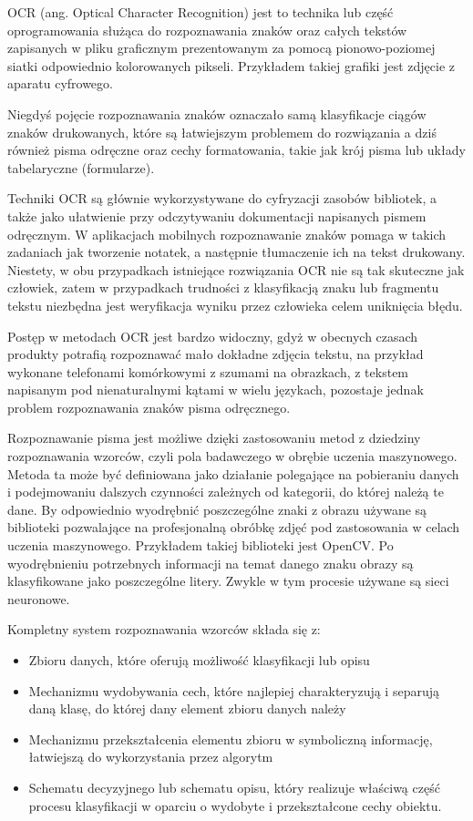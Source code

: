 \documentclass[brudnopis]{xmgr}
\begin{document}
OCR\cite{20} (ang. Optical Character Recognition) jest to technika lub część oprogramowania służąca do rozpoznawania znaków oraz całych tekstów zapisanych w pliku graficznym prezentowanym za pomocą pionowo-poziomej siatki odpowiednio kolorowanych pikseli. Przykładem takiej grafiki jest zdjęcie z aparatu cyfrowego. 

Niegdyś pojęcie rozpoznawania znaków oznaczało samą klasyfikacje ciągów znaków drukowanych, które są łatwiejszym problemem do rozwiązania a dziś również pisma odręczne oraz cechy formatowania, takie jak krój pisma lub układy tabelaryczne (formularze).

Techniki OCR są głównie wykorzystywane do cyfryzacji zasobów bibliotek, a także jako ułatwienie przy odczytywaniu dokumentacji napisanych pismem odręcznym. W aplikacjach mobilnych rozpoznawanie znaków pomaga w takich zadaniach jak tworzenie notatek, a następnie tłumaczenie ich na tekst drukowany. Niestety, w obu przypadkach istniejące rozwiązania OCR nie są tak skuteczne jak człowiek, zatem w przypadkach trudności z klasyfikacją znaku lub fragmentu tekstu niezbędna jest weryfikacja wyniku przez człowieka celem uniknięcia błędu.

Postęp w metodach OCR jest bardzo widoczny, gdyż w obecnych czasach produkty potrafią rozpoznawać mało dokładne zdjęcia tekstu, na przykład wykonane telefonami komórkowymi z szumami na obrazkach, z tekstem napisanym pod nienaturalnymi kątami w wielu językach, pozostaje jednak problem rozpoznawania znaków pisma odręcznego.

Rozpoznawanie pisma jest możliwe dzięki zastosowaniu metod z dziedziny rozpoznawania wzorców, czyli pola badawczego w obrębie uczenia maszynowego. Metoda ta może być definiowana jako działanie polegające na pobieraniu danych i podejmowaniu dalszych czynności zależnych od kategorii, do której należą te dane. By odpowiednio wyodrębnić poszczególne znaki z obrazu używane są biblioteki pozwalające na profesjonalną obróbkę zdjęć pod zastosowania w celach uczenia maszynowego. Przykładem takiej biblioteki jest OpenCV\cite{21}. Po wyodrębnieniu potrzebnych informacji na temat danego znaku obrazy są klasyfikowane jako poszczególne litery. Zwykle w tym procesie używane są sieci neuronowe.

Kompletny system rozpoznawania wzorców składa się z:
\begin{itemize}
\item
Zbioru danych, które oferują możliwość klasyfikacji lub opisu
\item
Mechanizmu wydobywania cech, które najlepiej charakteryzują i separują daną klasę, do której dany element zbioru danych należy
\item
Mechanizmu przekształcenia elementu zbioru w symboliczną informację, łatwiejszą do wykorzystania przez algorytm
\item
Schematu decyzyjnego lub schematu opisu, który realizuje właściwą część procesu klasyfikacji w oparciu o wydobyte i przekształcone cechy obiektu.
\end{itemize}
\end{document}

